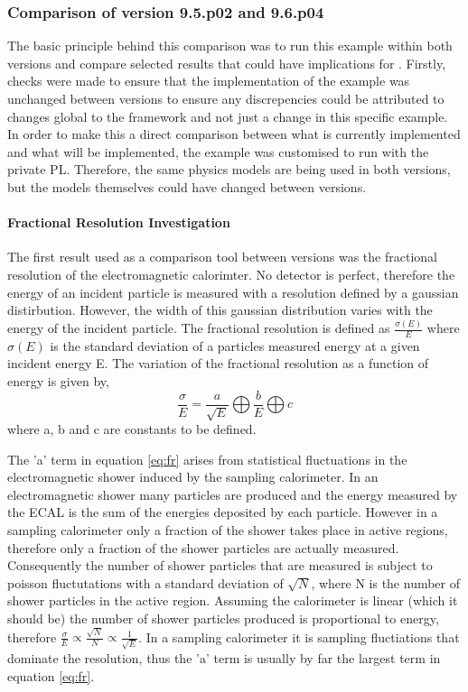\subsubsection{Comparison of \geant version 9.5.p02 and 9.6.p04}
The basic principle behind this comparison was to run this example within both \geant versions and compare selected results that could have implications for \lhcb.  Firstly, checks were made to ensure that the implementation of the example was unchanged between versions to ensure any discrepencies could be attributed to changes global to the \geant framework and not just a change in this specific example.  In order to make this a direct comparison between what is currently implemented and what will be implemented, the example was customised to run with the \lhcb private PL.  Therefore, the same physics models are being used in both versions, but the models themselves could have changed between versions.

\paragraph{Fractional Resolution Investigation}
\label{sec:Fractional Resolution Investigation}

The first result used as a comparison tool between \geant versions was the fractional resolution of the electromagnetic calorimter.  No detector is perfect, therefore the energy of an incident particle is measured with a resolution defined by a gaussian distirbution.  However, the width of this gaussian distribution varies with the energy of the incident particle.  The fractional resolution is defined as $\frac{\sigma(E)}{E}$ where $\sigma(E)$ is the standard deviation of a particles measured energy at a given incident energy E.  The variation of the fractional resolution as a function of energy is given by, 
\begin{equation}\label{eq:fr}
\frac{\sigma}{E}=\frac{a}{\sqrt{E}} \bigoplus \frac{b}{E} \bigoplus c
\end{equation}
where a, b and c are constants to be defined\cite{wigmans2000calorimetry}.  

The 'a' term in equation \ref{eq:fr} arises from statistical fluctuations in the electromagnetic shower induced by the sampling calorimeter.  In an electromagnetic shower many particles are produced and the energy measured by the ECAL is the sum of the energies deposited by each particle.  However in a sampling calorimeter only a fraction of the shower takes place in active regions, therefore only a fraction of the shower particles are actually measured.  Consequently the number of shower particles that are measured is subject to poisson fluctutations with a standard deviation of $\sqrt{N}$, where N is the number of shower particles in the active region.  Assuming the calorimeter is linear (which it should be) the number of shower particles produced is proportional to energy, therefore $\frac{\sigma}{E} \propto \frac{\sqrt{N}}{N} \propto \frac{1}{\sqrt{E}}$. In a sampling calorimeter it is sampling fluctiations that dominate the resolution, thus the 'a' term is usually by far the largest term in equation \ref{eq:fr}.  


